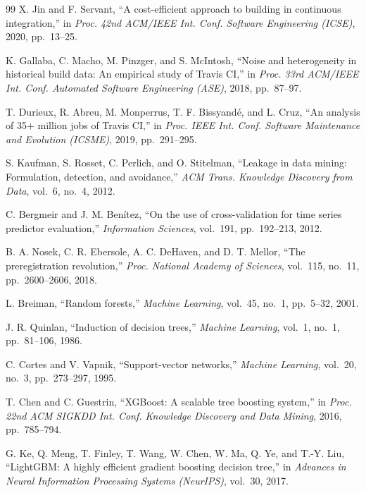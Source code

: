 \begin{thebibliography}{99}
 X. Jin and F. Servant, ``A cost-efficient approach to building in continuous integration,'' in \emph{Proc. 42nd ACM/IEEE Int. Conf. Software Engineering (ICSE)}, 2020, pp.~13--25.

 K. Gallaba, C. Macho, M. Pinzger, and S. McIntosh, ``Noise and heterogeneity in historical build data: An empirical study of Travis CI,'' in \emph{Proc. 33rd ACM/IEEE Int. Conf. Automated Software Engineering (ASE)}, 2018, pp.~87--97.

 T. Durieux, R. Abreu, M. Monperrus, T. F. Bissyandé, and L. Cruz, ``An analysis of 35+ million jobs of Travis CI,'' in \emph{Proc. IEEE Int. Conf. Software Maintenance and Evolution (ICSME)}, 2019, pp.~291--295.

 S. Kaufman, S. Rosset, C. Perlich, and O. Stitelman, ``Leakage in data mining: Formulation, detection, and avoidance,'' \emph{ACM Trans. Knowledge Discovery from Data}, vol.~6, no.~4, 2012.

 C. Bergmeir and J. M. Benítez, ``On the use of cross-validation for time series predictor evaluation,'' \emph{Information Sciences}, vol.~191, pp.~192--213, 2012.

 B. A. Nosek, C. R. Ebersole, A. C. DeHaven, and D. T. Mellor, ``The preregistration revolution,'' \emph{Proc. National Academy of Sciences}, vol.~115, no.~11, pp.~2600--2606, 2018.

 L. Breiman, ``Random forests,'' \emph{Machine Learning}, vol.~45, no.~1, pp.~5--32, 2001.

 J. R. Quinlan, ``Induction of decision trees,'' \emph{Machine Learning}, vol.~1, no.~1, pp.~81--106, 1986.

 C. Cortes and V. Vapnik, ``Support-vector networks,'' \emph{Machine Learning}, vol.~20, no.~3, pp.~273--297, 1995.

 T. Chen and C. Guestrin, ``XGBoost: A scalable tree boosting system,'' in \emph{Proc. 22nd ACM SIGKDD Int. Conf. Knowledge Discovery and Data Mining}, 2016, pp.~785--794.

 G. Ke, Q. Meng, T. Finley, T. Wang, W. Chen, W. Ma, Q. Ye, and T.-Y. Liu, ``LightGBM: A highly efficient gradient boosting decision tree,'' in \emph{Advances in Neural Information Processing Systems (NeurIPS)}, vol.~30, 2017.


\end{thebibliography}
